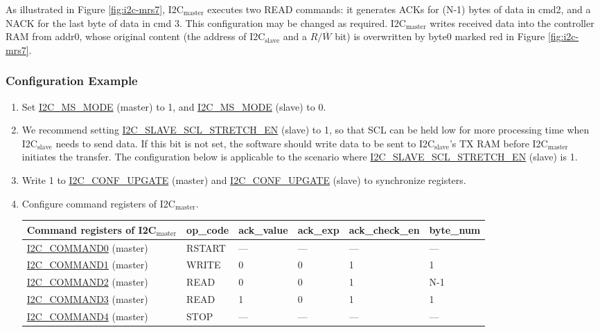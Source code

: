 \documentclass[main\_\_EN.tex]{subfiles}
\begin{document}
As illustrated in Figure \ref{fig:i2c-mrs7}, I2C$_\text{master}$ executes two READ commands: it generates ACKs for (N-1) bytes of data in cmd2, and a NACK for the last byte of data in cmd 3. This configuration may be changed as required. I2C$_\text{master}$ writes received data into the controller RAM from addr0, whose original content (the address of I2C$_\text{slave}$ and a $R/\overline W$ bit) is overwritten by byte0 marked red in Figure \ref{fig:i2c-mrs7}.

\subsubsection{Configuration Example}
\begin{enumerate}
\item Set \hyperref[fielddesc:I2CMSMODE]{I2C\_MS\_MODE} (master) to 1, and \hyperref[fielddesc:I2CMSMODE]{I2C\_MS\_MODE} (slave) to 0.
\item We recommend setting \hyperref[fielddesc:I2CSLAVESCLSTRETCHEN]{I2C\_SLAVE\_SCL\_STRETCH\_EN} (slave) to 1, so that SCL can be held low for more processing time when I2C$_\text{slave}$ needs to send data. If this bit is not set, the software should write data to be sent to I2C$_\text{slave}$'s TX RAM before I2C$_\text{master}$ initiates the transfer. The configuration below is applicable to the scenario where \hyperref[fielddesc:I2CSLAVESCLSTRETCHEN]{I2C\_SLAVE\_SCL\_STRETCH\_EN} (slave) is 1.
\item Write 1 to \hyperref[fielddesc:I2CCONFUPGATE]{I2C\_CONF\_UPGATE} (master) and \hyperref[fielddesc:I2CCONFUPGATE]{I2C\_CONF\_UPGATE} (slave) to synchronize registers.
\item Configure command registers of I2C$_\text{master}$.
\begin{longtable}{ | p{5cm} | p{1.5cm} | p{1.5cm} | p{1.5cm} |p{2.5cm} | p{1.5cm}|}
\hline\rowcolor{lightgray}
Command registers of I2C$_\text{master}$& op\_code & ack\_value&ack\_exp&ack\_check\_en&byte\_num  \\ \hline
\hyperref[fielddesc:I2CCOMMAND0]{I2C\_COMMAND0} (master)& RSTART& ---&---&---&---  \\ \hline
\hyperref[fielddesc:I2CCOMMAND1]{I2C\_COMMAND1} (master)& WRITE& 0&0&1&1  \\ \hline
\hyperref[fielddesc:I2CCOMMAND2]{I2C\_COMMAND2} (master)& READ& 0&0&1&N-1  \\ \hline
\hyperref[fielddesc:I2CCOMMAND3]{I2C\_COMMAND3} (master)& READ& 1&0&1&1  \\ \hline
\hyperref[fielddesc:I2CCOMMAND4]{I2C\_COMMAND4} (master)& STOP& ---&---&---&---  \\ \hline

\end{longtable}
\end{enumerate}
\end{document}
